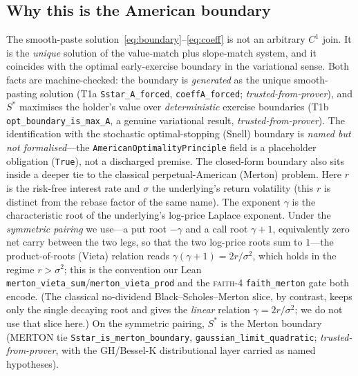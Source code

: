 \documentclass[runningheads]{llncs}
\newcommand{\tfp}{\emph{trusted-from-prover}}
\begin{document}
\subsection{Why this is the American boundary}
The smooth-paste solution~\eqref{eq:boundary}--\eqref{eq:coeff} is not an
arbitrary $C^{1}$ join. It is the \emph{unique} solution of the value-match plus
slope-match system, and it coincides with the optimal early-exercise boundary in
the variational sense. Both facts are machine-checked: the boundary is
\emph{generated} as the unique smooth-pasting solution (T1a
\texttt{Sstar\_A\_forced}, \texttt{coeffA\_forced}; \tfp{}), and $S^{\ast}$
maximises the holder's value over \emph{deterministic} exercise boundaries (T1b
\texttt{opt\_boundary\_is\_max\_A}, a genuine variational result, \tfp{}). The
identification with the stochastic optimal-stopping (Snell) boundary is
\emph{named but not formalised}---the \texttt{AmericanOptimalityPrinciple} field
is a placeholder obligation (\texttt{True}), not a discharged premise. The closed-form boundary also sits inside a
deeper tie to the classical perpetual-American (Merton) problem. Here $r$ is the
risk-free interest rate and $\sigma$ the underlying's return volatility (this $r$
is distinct from the rebase factor of the same name). The exponent $\gamma$ is the
characteristic root of the underlying's log-price Laplace exponent. Under the
\emph{symmetric pairing} we use---a put root $-\gamma$ and a call root $\gamma+1$,
equivalently zero net carry between the two legs, so that the two log-price roots
sum to $1$---the product-of-roots (Vieta) relation reads
$\gamma(\gamma+1)=2r/\sigma^{2}$, which holds in the regime $r>\sigma^{2}$; this is
the convention our Lean \texttt{merton\_vieta\_sum}/\texttt{merton\_vieta\_prod}
and the \textsc{faith}-4 \texttt{faith\_merton} gate both encode. (The classical no-dividend
Black--Scholes--Merton slice, by contrast, keeps only the single decaying root and
gives the \emph{linear} relation $\gamma=2r/\sigma^{2}$; we do not use that slice
here.) On the symmetric pairing, $S^{\ast}$ is the Merton boundary (MERTON tie
\texttt{Sstar\_is\_merton\_boundary}, \texttt{gaussian\_limit\_quadratic};
\tfp{}, with the GH/Bessel-K distributional layer carried as named hypotheses).
\end{document}
